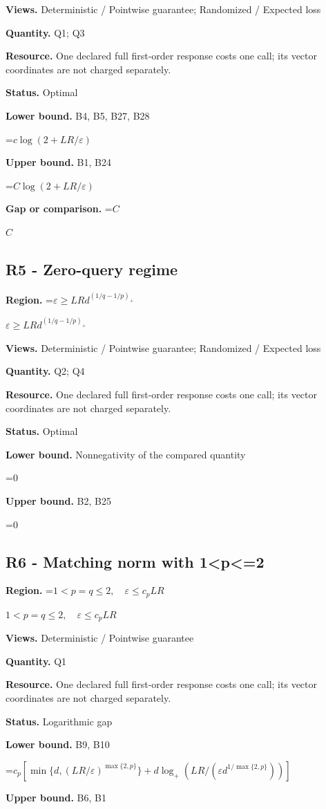 \documentclass[10pt,a4paper]{article}
\newcommand{\AtlasMath}[1]{\par\begingroup\centering\setbox0=\hbox{$\displaystyle #1$}\ifdim\wd0>1.4\linewidth\typeout{ATLAS WIDE FORMULA: \the\wd0}\fi\ifdim\wd0>\linewidth\resizebox{\linewidth}{!}{\box0}\else\box0\fi\par\endgroup}
\newcommand{\AtlasInlineMath}[1]{\begingroup\setbox0=\hbox{$#1$}\ifdim\wd0>.4\linewidth\endgroup\AtlasMath{#1}\else\endgroup$#1$\fi}
\begin{document}
\textbf{Views.} Deterministic / Pointwise guarantee; Randomized / Expected loss

\textbf{Quantity.} Q1; Q3

\textbf{Resource.} One declared full first-order response costs one call; its vector coordinates are not charged separately.

\textbf{Status.} Optimal

\textbf{Lower bound.} B4, B5, B27, B28

\AtlasMath{c\log(2+LR/\varepsilon)}
\textbf{Upper bound.} B1, B24

\AtlasMath{C\log(2+LR/\varepsilon)}
\textbf{Gap or comparison.} \AtlasInlineMath{C}

\subsection{R5 - Zero-query regime}
\textbf{Region.} \AtlasInlineMath{\varepsilon\ge LRd^{(1/q-1/p)_+}}

\textbf{Views.} Deterministic / Pointwise guarantee; Randomized / Expected loss

\textbf{Quantity.} Q2; Q4

\textbf{Resource.} One declared full first-order response costs one call; its vector coordinates are not charged separately.

\textbf{Status.} Optimal

\textbf{Lower bound.} Nonnegativity of the compared quantity

\AtlasMath{0}
\textbf{Upper bound.} B2, B25

\AtlasMath{0}
\subsection{R6 - Matching norm with 1<p<=2}
\textbf{Region.} \AtlasInlineMath{1<p=q\le2,\quad\varepsilon\le c_pLR}

\textbf{Views.} Deterministic / Pointwise guarantee

\textbf{Quantity.} Q1

\textbf{Resource.} One declared full first-order response costs one call; its vector coordinates are not charged separately.

\textbf{Status.} Logarithmic gap

\textbf{Lower bound.} B9, B10

\AtlasMath{c_p[\min\{d,(LR/\varepsilon)^{\max\{2,p\}}\}+d\log_+(LR/(\varepsilon d^{1/\max\{2,p\}}))]}
\textbf{Upper bound.} B6, B1
\end{document}
